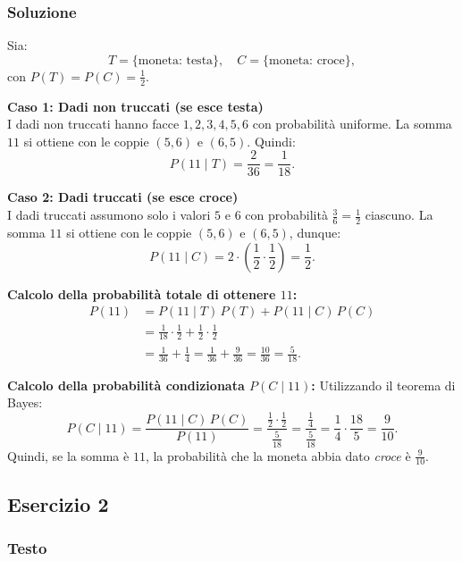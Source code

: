 \subsubsection{Soluzione}
Sia:
\[
T = \{\text{moneta: testa}\}, \quad C = \{\text{moneta: croce}\},
\]
con \(P(T)=P(C)=\frac{1}{2}\).

\textbf{Caso 1: Dadi non truccati (se esce testa)}\\[1mm]
I dadi non truccati hanno facce \(1,2,3,4,5,6\) con probabilità uniforme. La somma \(11\) si ottiene con le coppie \((5,6)\) e \((6,5)\). Quindi:
\[
P(11 \mid T) = \frac{2}{36} = \frac{1}{18}.
\]

\textbf{Caso 2: Dadi truccati (se esce croce)}\\[1mm]
I dadi truccati assumono solo i valori \(5\) e \(6\) con probabilità \( \frac{3}{6} = \frac{1}{2}\) ciascuno. La somma \(11\) si ottiene con le coppie \((5,6)\) e \((6,5)\), dunque:
\[
P(11 \mid C) = 2 \cdot \left(\frac{1}{2} \cdot \frac{1}{2}\right) = \frac{1}{2}.
\]

\textbf{Calcolo della probabilità totale di ottenere \(11\):}
\[
\begin{split}
P(11) &= P(11 \mid T) \, P(T) + P(11 \mid C) \, P(C) \\
&= \frac{1}{18} \cdot \frac{1}{2} + \frac{1}{2} \cdot \frac{1}{2} \\
&= \frac{1}{36} + \frac{1}{4} = \frac{1}{36} + \frac{9}{36} = \frac{10}{36} = \frac{5}{18}.
\end{split}
\]

\textbf{Calcolo della probabilità condizionata \(P(C \mid 11)\):}
Utilizzando il teorema di Bayes:
\[
P(C \mid 11) = \frac{P(11 \mid C) \, P(C)}{P(11)} 
= \frac{\frac{1}{2} \cdot \frac{1}{2}}{\frac{5}{18}} 
= \frac{\frac{1}{4}}{\frac{5}{18}} 
= \frac{1}{4} \cdot \frac{18}{5} 
= \frac{9}{10}.
\]
Quindi, se la somma è \(11\), la probabilità che la moneta abbia dato \emph{croce} è \(\frac{9}{10}\).

\subsection{Esercizio 2}
\subsubsection{Testo}

